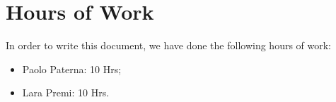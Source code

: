 \documentclass[12pt,a4paper]{article}
\begin{document}
	
	\tableofcontents
	\newpage
	
	
	
	
	\section{Hours of Work}
	In order to write this document, we have done the following hours of work:
	\begin{itemize}
	\item Paolo Paterna: 10 Hrs;
	\item Lara Premi: 10 Hrs.
	\end{itemize}
	\newpage
\end{document}
